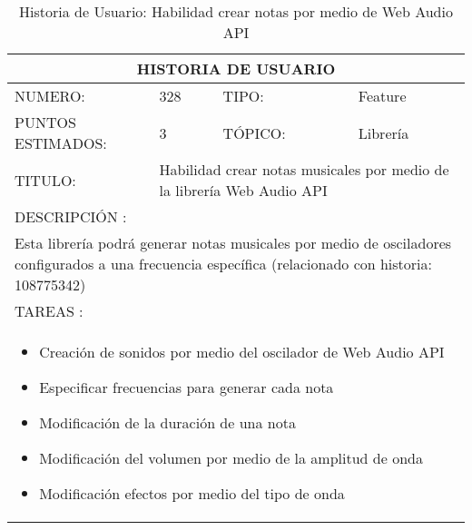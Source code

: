 \begin{table}[h]
\centering
\renewcommand{\arraystretch}{1.4}
\begin{tabular}{|*{4}{l|}}
\hline
\multicolumn{4}{|c|}{HISTORIA DE USUARIO} \\ \hline
NUMERO: & 328 & TIPO: & Feature \\ \hline
PUNTOS ESTIMADOS: & 3 & TÓPICO: & Librería \\ \hline
TITULO: & \multicolumn{3}{|p{7.2cm}|}{Habilidad crear notas musicales por medio de la librería Web Audio API} \\ \hline
\multicolumn{4}{|l|}{DESCRIPCIÓN : } \\ \hline
\multicolumn{4}{|p{11cm}|}{Esta librería podrá generar notas musicales por medio de osciladores configurados a una frecuencia específica (relacionado con historia: 108775342)} \\ \hline
\multicolumn{4}{|l|}{TAREAS : } \\ \hline
\multicolumn{4}{|p{11cm}|}{
\begin{minipage}[t]{\hsize}
  \begin{itemize}
    \item Creación de sonidos por medio del oscilador de Web Audio API
    \item Especificar frecuencias para generar cada nota
    \item Modificación de la duración de una nota
    \item Modificación del volumen por medio de la amplitud de onda
    \item Modificación efectos por medio del tipo de onda
  \end{itemize}
\end{minipage}
} \\ \hline
\end{tabular}
\caption{Historia de Usuario: Habilidad crear notas por medio de Web Audio API}
\label{tab:Primero}
\end{table}



